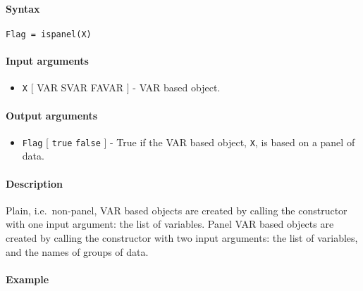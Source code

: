 


	\paragraph{Syntax}\label{syntax}

\begin{verbatim}
Flag = ispanel(X)
\end{verbatim}

\paragraph{Input arguments}\label{input-arguments}

\begin{itemize}
\itemsep1pt\parskip0pt
\item
  \texttt{X} {[} VAR \textbar{} SVAR \textbar{} FAVAR {]} - VAR based
  object.
\end{itemize}

\paragraph{Output arguments}\label{output-arguments}

\begin{itemize}
\itemsep1pt\parskip0pt
\item
  \texttt{Flag} {[} \texttt{true} \textbar{} \texttt{false} {]} - True
  if the VAR based object, \texttt{X}, is based on a panel of data.
\end{itemize}

\paragraph{Description}\label{description}

Plain, i.e.~non-panel, VAR based objects are created by calling the
constructor with one input argument: the list of variables. Panel VAR
based objects are created by calling the constructor with two input
arguments: the list of variables, and the names of groups of data.

\paragraph{Example}\label{example}



